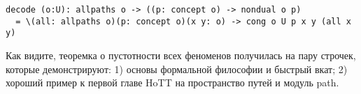 \begin{lstlisting}
decode (o:U): allpaths o -> ((p: concept o) -> nondual o p)
  = \(all: allpaths o)(p: concept o)(x y: o) -> cong o U p x y (all x y)
\end{lstlisting}

Как видите, теоремка о пустотности всех феноменов получилась на пару
строчек, которые демонстрируют: 1) основы формальной философии и быстрый вкат;
2) хороший пример к первой главе HoTT на пространство путей и модуль path.

